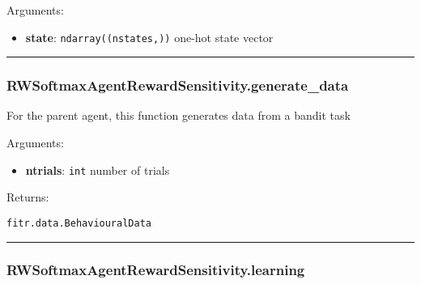 Arguments:

\begin{itemize}
\tightlist
\item
  \textbf{state}: \texttt{ndarray((nstates,))} one-hot state vector
\end{itemize}

\begin{center}\rule{0.5\linewidth}{\linethickness}\end{center}

\subsubsection{RWSoftmaxAgentRewardSensitivity.generate\_data}\label{rwsoftmaxagentrewardsensitivity.generate_data}

\begin{Shaded}
\begin{Highlighting}[]
\end{Highlighting}
\end{Shaded}

For the parent agent, this function generates data from a bandit task

Arguments:

\begin{itemize}
\tightlist
\item
  \textbf{ntrials}: \texttt{int} number of trials
\end{itemize}

Returns:

\texttt{fitr.data.BehaviouralData}

\begin{center}\rule{0.5\linewidth}{\linethickness}\end{center}

\subsubsection{RWSoftmaxAgentRewardSensitivity.learning}\label{rwsoftmaxagentrewardsensitivity.learning}

\begin{Shaded}
\begin{Highlighting}[]
\end{Highlighting}
\end{Shaded}


